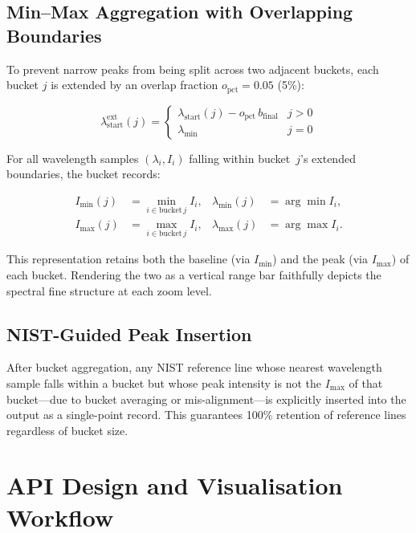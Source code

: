 \documentclass[a4paper,twocolumn,10pt]{article}
\begin{document}
\subsection{Min--Max Aggregation with Overlapping Boundaries}

To prevent narrow peaks from being split across two adjacent buckets,
each bucket $j$ is extended by an overlap fraction
$o_{\text{pct}} = 0.05$ (5\%):

\begin{equation}
\lambda_{\text{start}}^{\text{ext}}(j) =
  \begin{cases}
    \lambda_{\text{start}}(j) - o_{\text{pct}}\,b_{\text{final}} & j > 0 \\
    \lambda_{\min} & j = 0
  \end{cases}
\end{equation}

For all wavelength samples $(\lambda_i, I_i)$ falling within
bucket~$j$'s extended boundaries, the bucket records:

\begin{align}
I_{\min}(j) &= \min_{i \in \text{bucket}\,j} I_i, &
\lambda_{\min}(j) &= \arg\min I_i, \\
I_{\max}(j) &= \max_{i \in \text{bucket}\,j} I_i, &
\lambda_{\max}(j) &= \arg\max I_i.
\end{align}

This representation retains both the baseline (via $I_{\min}$) and
the peak (via $I_{\max}$) of each bucket.  Rendering the two as a
vertical range bar faithfully depicts the spectral fine structure
at each zoom level.

\subsection{NIST-Guided Peak Insertion}

After bucket aggregation, any NIST reference line whose nearest
wavelength sample falls within a bucket but whose peak intensity is
not the $I_{\max}$ of that bucket---due to bucket averaging or
mis-alignment---is explicitly inserted into the output as a
single-point record.  This guarantees 100\% retention of reference
lines regardless of bucket size.


\section{API Design and Visualisation Workflow}
\label{sec:api}
\end{document}
